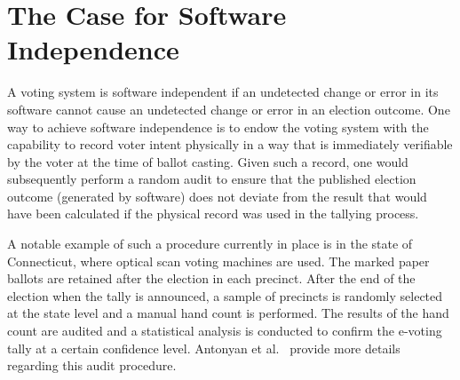 \section{The Case for Software Independence}

A voting system is software independent if an undetected change or
error in its software cannot cause an undetected change or error in an
election outcome. One way to achieve software independence is to endow
the voting system with the capability to record voter intent
physically in a way that is immediately verifiable by the voter at the
time of ballot casting. Given such a record, one would subsequently
perform a random audit to ensure that the published election outcome
(generated by software) does not deviate from the result that would
have been calculated if the physical record was used in the tallying
process.

A notable example of such a procedure currently in place is in the
state of Connecticut, where optical scan voting machines are used. The
marked paper ballots are retained after the election in each precinct.
After the end of the election when the tally is announced, a sample of
precincts is randomly selected at the state level and a manual hand
count is performed. The results of the hand count are audited and a
statistical analysis is conducted to confirm the e-voting tally at a
certain confidence level. Antonyan et al.~\cite{antonyan2009state}
provide more details regarding this audit procedure.


